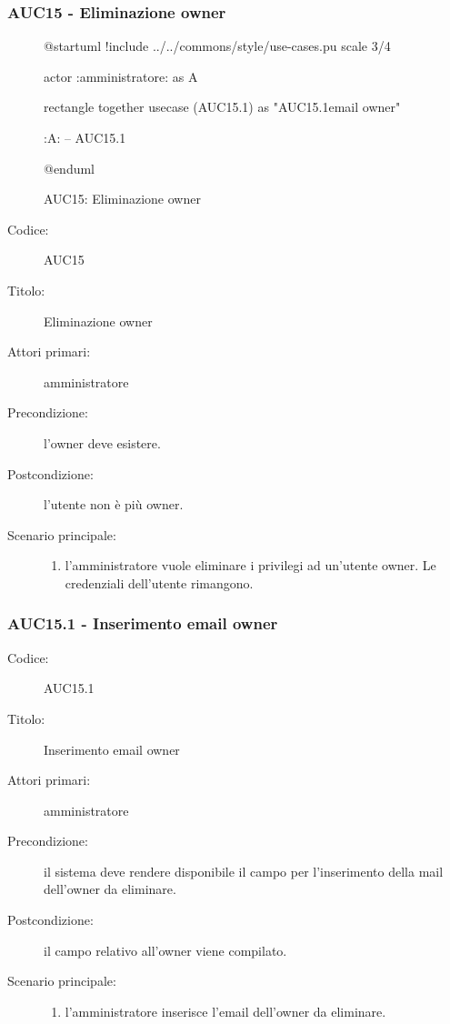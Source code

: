 \documentclass[../analisi-dei-requisiti.tex]{subfiles}
\begin{document}
\subsubsection{AUC15 - Eliminazione owner}%
\label{subsub:AUC15}

\begin{figure}[h!]
  \centering
  \begin{plantuml}
  @startuml
  !include ../../commons/style/use-cases.pu
  scale 3/4

  actor :amministratore: as A

  rectangle {
    together {
      usecase (AUC15.1) as "AUC15.1\nInserimento email owner"
    }
  }

  :A: -- AUC15.1

  @enduml
  \end{plantuml}
  \caption{AUC15: Eliminazione owner}
  \label{fig:auc15}
\end{figure}

\begin{description}
  \item[Codice:] AUC15
  \item[Titolo:] Eliminazione owner
  \item[Attori primari:] amministratore
  \item[Precondizione:] l'owner deve esistere.
  \item[Postcondizione:] l'utente non è più owner.
  \item[Scenario principale:]
  \begin{enumerate}
    \item l'amministratore vuole eliminare i privilegi ad un'utente owner. Le credenziali dell'utente rimangono.
  \end{enumerate}
\end{description}

\subsubsection{AUC15.1 - Inserimento email owner}%
\label{subsub:AUC15.1}
\begin{description}
  \item[Codice:] AUC15.1
  \item[Titolo:] Inserimento email owner
  \item[Attori primari:] amministratore
  \item[Precondizione:] il sistema deve rendere disponibile il campo per l'inserimento della mail dell'owner da eliminare.
  \item[Postcondizione:] il campo relativo all'owner viene compilato.
  \item[Scenario principale:]
  \begin{enumerate}
    \item l'amministratore inserisce l'email dell'owner da eliminare.
  \end{enumerate}
\end{description}
\end{document}
